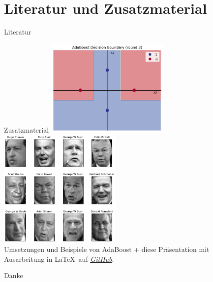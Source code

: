 \documentclass[hyperref={bookmarks=false},11pt,dvipsnames]{beamer}
\begin{document}
\section{Literatur und Zusatzmaterial}
\begin{frame}[allowframebreaks]{Literatur}
	\nocite{*}
	
	
\end{frame}
\begin{frame}{Zusatzmaterial}
	\centering
	\includegraphics[width=0.45\textwidth]{../Code/img/XOR_Code.png}
	\includegraphics[width=0.45\textwidth]{../Code/img/face_recognition.png}\\
	Umsetzungen und Beispiele von AdaBoost + diese Präsentation mit Ausarbeitung
	in \LaTeX~auf \textcolor{buwgreen}{\emph{\underline{\href{https://github.com/Vinfeno/TTAIDM_AdaBoost}{GitHub}}}}.
\end{frame}

\begin{frame}{Danke}
\end{frame}
\end{document}
